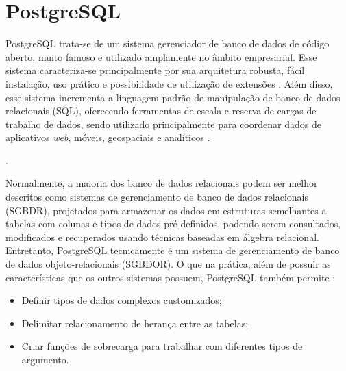 \section{PostgreSQL}
\label{sec:postgresql}
PostgreSQL trata-se de um sistema gerenciador de banco de dados de código aberto, muito famoso e utilizado amplamente no âmbito empresarial. Esse sistema caracteriza-se principalmente por sua arquitetura robusta, fácil instalação, uso prático e possibilidade de utilização de extensões \cite{PostgreSQL2023}. Além disso, esse sistema incrementa a linguagem padrão de manipulação de banco de dados relacionais (SQL), oferecendo ferramentas de escala e reserva de cargas de trabalho de dados, sendo utilizado principalmente para coordenar dados de aplicativos \textit{web}, móveis, geospaciais e analíticos \cite{Kinsta2023}.

\begin{citacao}

    \cite{PostgreSQL2023}.
\end{citacao}

Normalmente, a maioria dos banco de dados relacionais podem ser melhor descritos como sistemas de gerenciamento de banco de dados relacionais (SGBDR), projetados para armazenar os dados em estruturas semelhantes a tabelas com colunas e tipos de dados pré-definidos, podendo serem consultados, modificados e recuperados usando técnicas baseadas em álgebra relacional. Entretanto, PostgreSQL tecnicamente é um sistema de gerenciamento de banco de dados objeto-relacionais (SGBDOR). O que na prática, além de possuir as características que os outros sistemas possuem, PostgreSQL também permite \cite{Prisma2020}:

\begin{itemize}
    \item Definir tipos de dados complexos customizados;
    \item Delimitar relacionamento de herança entre as tabelas;
    \item Criar funções de sobrecarga para trabalhar com diferentes tipos de argumento.
\end{itemize} 

